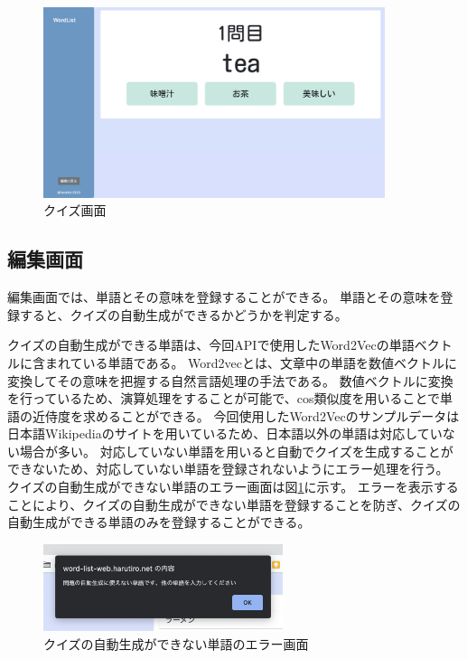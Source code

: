 \documentclass[11pt,a4paper]{jsarticle}
\begin{document}
\begin{figure}[htbp]
    \begin{center}
        \includegraphics[width=100mm]{./img/quiz_screen.png}
    \end{center}
    \caption{クイズ画面}
\end{figure}

\subsection{編集画面}
編集画面では、単語とその意味を登録することができる。
単語とその意味を登録すると、クイズの自動生成ができるかどうかを判定する。

クイズの自動生成ができる単語は、今回APIで使用したWord2Vecの単語ベクトルに含まれている単語である。
Word2vecとは、文章中の単語を数値ベクトルに変換してその意味を把握する自然言語処理の手法である。
数値ベクトルに変換を行っているため、演算処理をすることが可能で、cos類似度を用いることで単語の近侍度を求めることができる。
今回使用したWord2Vecのサンプルデータは日本語Wikipediaのサイトを用いているため、日本語以外の単語は対応していない場合が多い。
対応していない単語を用いると自動でクイズを生成することができないため、対応していない単語を登録されないようにエラー処理を行う。
クイズの自動生成ができない単語のエラー画面は図\ref{fig:quiz_error}に示す。
エラーを表示することにより、クイズの自動生成ができない単語を登録することを防ぎ、クイズの自動生成ができる単語のみを登録することができる。

\begin{figure}[htbp]
    \begin{center}
        \includegraphics[width=70mm]{./img/error_popup.png}
    \end{center}
    \caption{クイズの自動生成ができない単語のエラー画面}
    \label{fig:quiz_error}
\end{figure}
\end{document}
